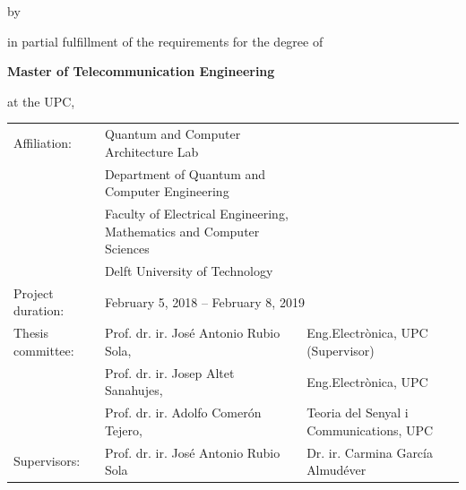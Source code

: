 \begin{titlepage}
\begin{center}
{\makeatletter
\titlestyle\color{tudelft-cyan}\Huge\@title
\makeatother}

{\makeatletter
\ifx\@subtitle\undefined\else
    \bigskip
    \titlefont\titleshape\LARGE\@subtitle
\fi
\makeatother}

\bigskip
\bigskip

by

\bigskip
\bigskip

{\makeatletter
\titlefont\Large\@author
\makeatother}

\bigskip
\bigskip

in partial fulfillment of the requirements for the degree of

\bigskip
\bigskip

{\bfseries Master of Telecommunication Engineering}

\bigskip
\bigskip

at the UPC,


\vfill

\begin{tabular}{lll}
    Affiliation: & Quantum and Computer Architecture Lab\\
                & Department of Quantum and Computer Engineering\\
                & Faculty of Electrical Engineering, Mathematics and Computer Sciences\\
                & Delft University of Technology\\
    Project duration: & \multicolumn{2}{l}{February 5, 2018 -- February 8, 2019} \\
    Thesis committee:   & Prof. dr. ir. José Antonio Rubio Sola, & Eng.Electrònica, UPC (Supervisor)\\
                        & Prof. dr. ir. Josep Altet Sanahujes, & Eng.Electrònica, UPC \\
                        & Prof. dr. ir. Adolfo Comerón Tejero, & Teoria del Senyal i Communications, UPC\\
    Supervisors: & Prof. dr. ir. José Antonio Rubio Sola & Dr. ir. Carmina García Almudéver
       
\end{tabular}


\bigskip
\bigskip

\end{center}

\end{titlepage}

